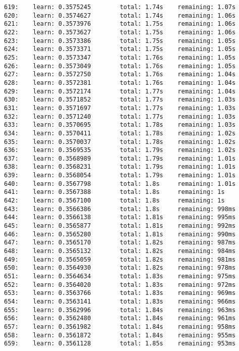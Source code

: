 \documentclass[11pt]{article}
\begin{document}
\begin{Verbatim}[commandchars=\\\{\}]
619:    learn: 0.3575245        total: 1.74s    remaining: 1.07s
620:    learn: 0.3574627        total: 1.74s    remaining: 1.06s
621:    learn: 0.3573976        total: 1.75s    remaining: 1.06s
622:    learn: 0.3573627        total: 1.75s    remaining: 1.06s
623:    learn: 0.3573386        total: 1.75s    remaining: 1.05s
624:    learn: 0.3573371        total: 1.75s    remaining: 1.05s
625:    learn: 0.3573347        total: 1.76s    remaining: 1.05s
626:    learn: 0.3573049        total: 1.76s    remaining: 1.05s
627:    learn: 0.3572750        total: 1.76s    remaining: 1.04s
628:    learn: 0.3572381        total: 1.76s    remaining: 1.04s
629:    learn: 0.3572174        total: 1.77s    remaining: 1.04s
630:    learn: 0.3571852        total: 1.77s    remaining: 1.03s
631:    learn: 0.3571697        total: 1.77s    remaining: 1.03s
632:    learn: 0.3571240        total: 1.77s    remaining: 1.03s
633:    learn: 0.3570695        total: 1.78s    remaining: 1.03s
634:    learn: 0.3570411        total: 1.78s    remaining: 1.02s
635:    learn: 0.3570037        total: 1.78s    remaining: 1.02s
636:    learn: 0.3569535        total: 1.79s    remaining: 1.02s
637:    learn: 0.3568989        total: 1.79s    remaining: 1.01s
638:    learn: 0.3568231        total: 1.79s    remaining: 1.01s
639:    learn: 0.3568054        total: 1.79s    remaining: 1.01s
640:    learn: 0.3567798        total: 1.8s     remaining: 1.01s
641:    learn: 0.3567388        total: 1.8s     remaining: 1s
642:    learn: 0.3567100        total: 1.8s     remaining: 1s
643:    learn: 0.3566386        total: 1.8s     remaining: 998ms
644:    learn: 0.3566138        total: 1.81s    remaining: 995ms
645:    learn: 0.3565877        total: 1.81s    remaining: 992ms
646:    learn: 0.3565280        total: 1.81s    remaining: 990ms
647:    learn: 0.3565170        total: 1.82s    remaining: 987ms
648:    learn: 0.3565132        total: 1.82s    remaining: 984ms
649:    learn: 0.3565059        total: 1.82s    remaining: 981ms
650:    learn: 0.3564930        total: 1.82s    remaining: 978ms
651:    learn: 0.3564634        total: 1.83s    remaining: 975ms
652:    learn: 0.3564020        total: 1.83s    remaining: 972ms
653:    learn: 0.3563766        total: 1.83s    remaining: 969ms
654:    learn: 0.3563141        total: 1.83s    remaining: 966ms
655:    learn: 0.3562996        total: 1.84s    remaining: 963ms
656:    learn: 0.3562480        total: 1.84s    remaining: 961ms
657:    learn: 0.3561982        total: 1.84s    remaining: 958ms
658:    learn: 0.3561872        total: 1.84s    remaining: 955ms
659:    learn: 0.3561128        total: 1.85s    remaining: 953ms

\end{Verbatim}
\end{document}
